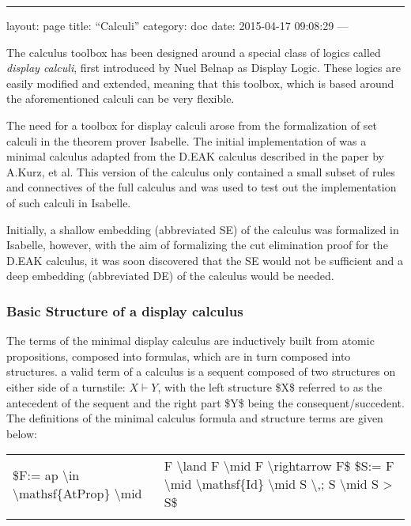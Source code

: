 \documentclass[]{article}
\begin{document}
\begin{center}\rule{3in}{0.4pt}\end{center}

layout: page title: ``Calculi'' category: doc date: 2015-04-17 09:08:29
---

The calculus toolbox has been designed around a special class of logics
called \emph{display calculi}, first introduced by Nuel Belnap as
Display Logic. These logics are easily modified and extended, meaning
that this toolbox, which is based around the aforementioned calculi can
be very flexible.

The need for a toolbox for display calculi arose from the formalization
of set calculi in the theorem prover Isabelle. The initial
implementation of was a minimal calculus adapted from the D.EAK calculus
described in the paper by A.Kurz, et al. This version of the calculus
only contained a small subset of rules and connectives of the full
calculus and was used to test out the implementation of such calculi in
Isabelle.

Initially, a shallow embedding (abbreviated SE) of the calculus was
formalized in Isabelle, however, with the aim of formalizing the cut
elimination proof for the D.EAK calculus, it was soon discovered that
the SE would not be sufficient and a deep embedding (abbreviated DE) of
the calculus would be needed.

\subsubsection{Basic Structure of a display
calculus}\label{basic-structure-of-a-display-calculus}

The terms of the minimal display calculus are inductively built from
atomic propositions, composed into formulas, which are in turn composed
into structures. a valid term of a calculus is a sequent composed of two
structures on either side of a turnstile: $X \vdash Y$, with the left
structure \$X\$ referred to as the antecedent of the sequent and the
right part \$Y\$ being the consequent/succedent. The definitions of the
minimal calculus formula and structure terms are given below:

\begin{longtable}[c]{@{}ll@{}}
\toprule\addlinespace
\$F:= ap \textbackslash{}in \textbackslash{}mathsf\{AtProp\}
\textbackslash{}mid & F \textbackslash{}land F \textbackslash{}mid F
\textbackslash{}rightarrow F\$ \$S:= F \textbackslash{}mid
\textbackslash{}mathsf\{Id\} \textbackslash{}mid S \textbackslash{},; S
\textbackslash{}mid S \textgreater{} S\$
\\\addlinespace
\bottomrule
\end{longtable}
\end{document}
